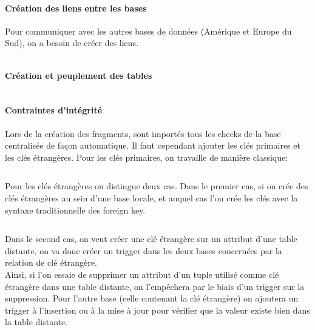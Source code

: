 \documentclass[10pt,a4paper]{article}
\theoremstyle{plain}
\begin{document}
\inputminted{sql}{EUN_connexion_db_ryori.sql}

\paragraph{Création des liens entre les bases}

Pour communiquer avec les autres bases de données (Amérique et Europe du Sud), on a besoin de créer des liens.

\inputminted{sql}{INSA-DB12-EuropeNord-creation-liens-db.sql}
\newpage 

\paragraph{Création et peuplement des tables}

\inputminted{sql}{INSA-DB12-EuropeNord-fragmentation.sql}
\newpage 

\paragraph{Contraintes d'intégrité}

Lors de la création des fragments, sont importés tous les checks de la base centralisée de façon automatique. Il faut cependant ajouter les clés primaires et les clés étrangères. Pour les clés primaires, on travaille de manière classique:\\
\inputminted{sql}{INSA-DB12-EuropeNord-contraintes-pk.sql}

\newpage

Pour les clés étrangères on distingue deux cas. Dans le premier cas, si on crée des clés étrangères au sein d'une base locale, et auquel cas l'on crée les clés avec la syntaxe traditionnelle des foreign key.

\inputminted{sql}{INSA-DB12-EuropeNord-contraintes-fk.sql}

Dans le second cas, on veut créer une clé étrangère sur un attribut d'une table distante, on va donc créer un trigger dans les deux bases concernées par la relation de clé étrangère.\\
Ainsi, si l'on essaie de supprimer un attribut d'un tuple utilisé comme clé étrangère dans une table distante, on l'empêchera par le biais d'un trigger sur la suppression. Pour l'autre base (celle contenant la clé étrangère) on ajoutera un trigger à l'insertion ou à la mise à jour pour vérifier que la valeur existe bien dans la table distante. \\
\end{document}
